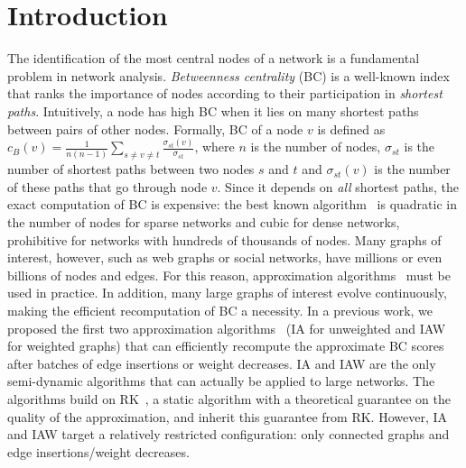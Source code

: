 \documentclass[english]{llncs}
\newcommand{\rk}{\textsf{RK}\xspace}
\newcommand{\ia}{\textsf{IA}\xspace}
\newcommand{\iaw}{\textsf{IAW}\xspace}
\begin{document}
\section{Introduction}
\label{sec:intro}
The identification of the most central nodes of a network is a fundamental problem in network analysis. \emph{Betweenness
centrality} (BC) is a well-known index that ranks the importance of nodes according to their participation in \textit{shortest paths}. Intuitively, a node has 
high BC when it lies on many shortest paths between pairs of other nodes.
Formally, BC of a node $v$ is defined as $c_B(v) = \frac{1}{n(n-1)} \sum_{s \neq v \neq t} \frac{\sigma_{st}(v)}{\sigma_{st}}$, where $n$ is the number of nodes,
$\sigma_{st}$ is the number of shortest paths between two nodes $s$ and $t$ and $\sigma_{st}(v)$ is the number of these paths that go through node $v$.
Since it depends on \textit{all} shortest paths, the exact computation of BC is expensive: the best known 
algorithm~\cite{Brandes01betweennessCentrality} is quadratic in the number of nodes for sparse networks and cubic for dense networks, prohibitive for networks with hundreds of thousands of nodes. Many graphs of interest, however, such as web 
graphs or social networks, have millions or even billions of nodes and edges. 
For this reason, approximation algorithms~\cite{DBLP:journals/ijbc/BrandesP07,DBLP:conf/alenex/GeisbergerSS08,DBLP:conf/waw/BaderKMM07} must be used in practice. In addition, many
large graphs of interest evolve continuously, making the efficient recomputation of BC a necessity.
In a previous work, we proposed the first two approximation algorithms~\cite{DBLP:conf/alenex/BergaminiMS15} (\ia for unweighted and \iaw for weighted graphs) 
that can efficiently recompute the approximate BC scores after batches of edge insertions or weight decreases. 
\ia and \iaw are the only semi-dynamic algorithms that can actually be applied to large networks. 
The algorithms build on \rk~\cite{DBLP:conf/wsdm/RiondatoK14}, a static algorithm with a theoretical guarantee on the quality of the approximation, and inherit this guarantee from \rk. 
However, \ia and \iaw target a relatively restricted configuration: only connected graphs and edge insertions/weight decreases.
\vspace{-1ex}
\end{document}
